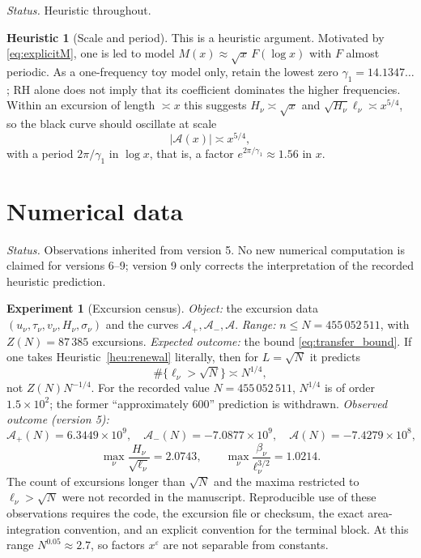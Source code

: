 \documentclass[11pt]{amsart}
\numberwithin{equation}{section}
\theoremstyle{plain}
\theoremstyle{definition}
\newtheorem{experiment}[theorem]{Experiment}
\newtheorem{heuristic}[theorem]{Heuristic}
\theoremstyle{remark}
\newcommand{\Ap}{\mathcal{A}_{+}}
\newcommand{\Am}{\mathcal{A}_{-}}
\newcommand{\Anet}{\mathcal{A}}
\newcommand{\eps}{\varepsilon}
\begin{document}
\noindent\emph{Status.} Heuristic throughout.

\begin{heuristic}[Scale and period]
\label{heu:model}
This is a heuristic argument. Motivated by \eqref{eq:explicitM}, one is led
to model $M(x)\approx\sqrt x\,F(\log x)$ with $F$ almost periodic.  As a one-frequency toy model only, retain the
lowest zero $\gamma_1=14.1347\ldots$; RH alone does not imply that its
coefficient dominates the higher frequencies. Within an excursion of length
$\asymp x$ this suggests $H_\nu\asymp\sqrt x$ and
$\sqrt{H_\nu}\ell_\nu\asymp x^{5/4}$, so the black curve should oscillate at
scale
\begin{equation}
\label{eq:model_scale}
  |\Anet(x)|\asymp x^{5/4},
\end{equation}
with a period $2\pi/\gamma_1$ in $\log x$, that is, a factor
$e^{2\pi/\gamma_1}\approx1.56$ in $x$.
\end{heuristic}

\section{Numerical data}
\label{sec:data}

\noindent\emph{Status.} Observations inherited from version 5.  No new
numerical computation is claimed for versions 6--9; version 9 only corrects
the interpretation of the recorded heuristic prediction.

\begin{experiment}[Excursion census]
\label{exp:census}
\emph{Object:} the excursion data $(u_\nu,\tau_\nu,v_\nu,H_\nu,\sigma_\nu)$
and the curves $\Ap,\Am,\Anet$.
\emph{Range:} $n\le N=455\,052\,511$, with $Z(N)=87\,385$ excursions.
\emph{Expected outcome:} the bound \eqref{eq:transfer_bound}.  If one takes
Heuristic~\ref{heu:renewal} literally, then for $L=\sqrt N$ it predicts
\[
\#\{\ell_\nu>\sqrt N\}\asymp N^{1/4},
\]
not $Z(N)N^{-1/4}$.  For the recorded value
$N=455\,052\,511$, $N^{1/4}$ is of order $1.5\times10^2$; the former
``approximately 600'' prediction is withdrawn.
\emph{Observed outcome (version 5):}
\begin{equation}
\label{eq:census_values}
  \Ap(N)=6.3449\times10^9,\quad \Am(N)=-7.0877\times10^9,\quad
  \Anet(N)=-7.4279\times10^8,
\end{equation}
\begin{equation}
\label{eq:census_max}
  \max_\nu\frac{H_\nu}{\sqrt{\ell_\nu}}=2.0743,\qquad
  \max_\nu\frac{\beta_\nu}{\ell_\nu^{3/2}}=1.0214 .
\end{equation}
The count of excursions longer than $\sqrt N$ and the maxima restricted to
$\ell_\nu>\sqrt N$ were not recorded in the manuscript.  Reproducible use
of these observations requires the code, the excursion file or checksum,
the exact area-integration convention, and an explicit convention for the
terminal block. At this range $N^{0.05}\approx2.7$, so
factors $x^\eps$ are not separable from constants.
\end{experiment}
\end{document}
